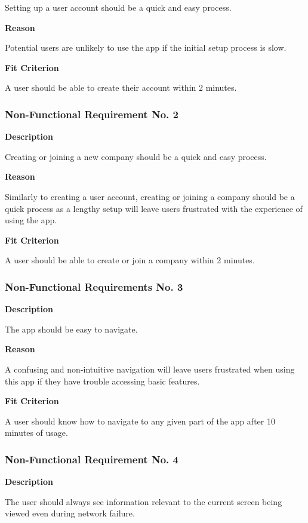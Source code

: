 Setting up a user account should be a quick and easy process.

\textbf{Reason}

Potential users are unlikely to use the app if the initial setup process is slow.

\textbf{Fit Criterion}

A user should be able to create their account within 2 minutes.

\subsubsection{Non-Functional Requirement No. 2}

\textbf{Description}

Creating or joining  a new company should be a quick and easy process.

\textbf{Reason}

Similarly to creating a user account, creating or joining a company should be a quick process as a lengthy setup will leave users frustrated with the experience of using the app.

\textbf{Fit Criterion}

A user should be able to create or join a company within 2 minutes.

\subsubsection{Non-Functional Requirements No. 3}

\textbf{Description}

The app should be easy to navigate.

\textbf{Reason}

A confusing and non-intuitive navigation will leave users frustrated when using this app if they have trouble accessing basic features.

\textbf{Fit Criterion}

A user should know how to navigate to any given part of the app after 10 minutes of usage.

\subsubsection{Non-Functional Requirement No. 4}

\textbf{Description}

The user should always see information relevant to the current screen being viewed even during network failure.

